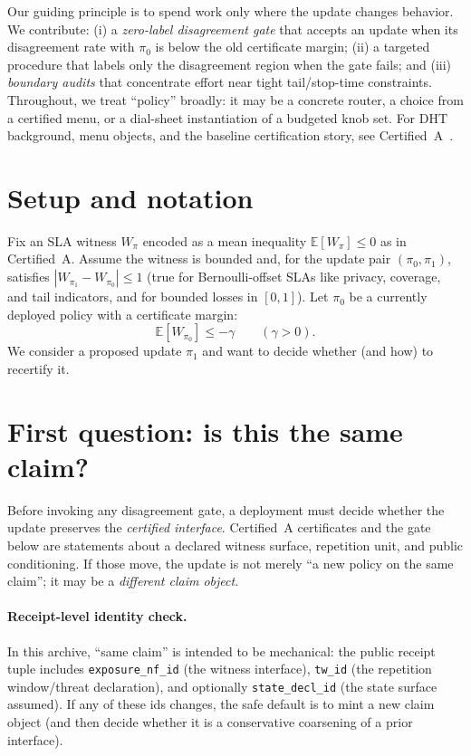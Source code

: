 \documentclass[11pt]{article}
\begin{document}
Our guiding principle is to spend work only where the update changes behavior.
We contribute:
(i) a \emph{zero-label disagreement gate} that accepts an update when its disagreement rate with $\pi_0$ is below the old certificate margin;
(ii) a targeted procedure that labels only the disagreement region when the gate fails; and
(iii) \emph{boundary audits} that concentrate effort near tight tail/stop-time constraints.
Throughout, we treat ``policy'' broadly: it may be a concrete router, a choice from a certified menu, or a dial-sheet instantiation of a budgeted knob set.
For DHT background, menu objects, and the baseline certification story, see Certified~A~\cite{series:menus}.

\section{Setup and notation}
Fix an SLA witness $W_\pi$ encoded as a mean inequality $\mathbb{E}[W_\pi]\le 0$ as in Certified~A.
Assume the witness is bounded and, for the update pair $(\pi_0,\pi_1)$, satisfies $|W_{\pi_1}-W_{\pi_0}|\le 1$ (true for Bernoulli-offset SLAs like privacy, coverage, and tail indicators, and for bounded losses in $[0,1]$).
Let $\pi_0$ be a currently deployed policy with a certificate margin:
\begin{equation}
\mathbb{E}[W_{\pi_0}] \le -\gamma
\qquad (\gamma>0).
\label{eq:margin}
\end{equation}
We consider a proposed update $\pi_1$ and want to decide whether (and how) to recertify it.

\section{First question: is this the same claim?}
Before invoking any disagreement gate, a deployment must decide whether the update preserves the \emph{certified interface}.
Certified~A certificates and the gate below are statements about a declared witness surface, repetition unit, and public conditioning.
If those move, the update is not merely ``a new policy on the same claim''; it may be a \emph{different claim object}.\cite{series:traceifaces,series:contractobjects}

\paragraph{Receipt-level identity check.}
In this archive, ``same claim'' is intended to be mechanical: the public receipt tuple includes \texttt{exposure\_nf\_id} (the witness interface), \texttt{tw\_id} (the repetition window/threat declaration), and optionally \texttt{state\_decl\_id} (the state surface assumed).
If any of these ids changes, the safe default is to mint a new claim object (and then decide whether it is a conservative coarsening of a prior interface).\cite{series:receiptitems,series:planstateequiv}
\end{document}
